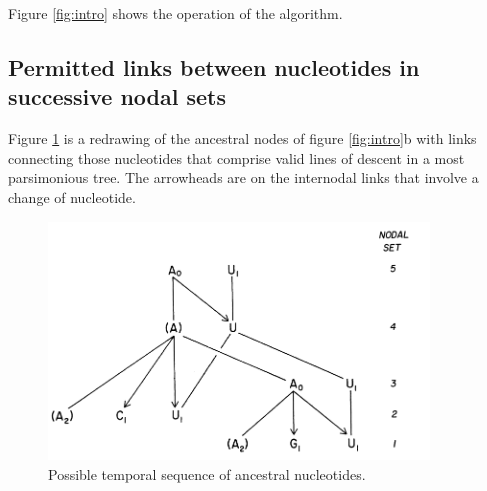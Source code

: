 Figure \ref{fig:intro} shows the operation of the algorithm.

\subsection{Permitted links between nucleotides in successive nodal sets}
Figure \ref{fig:temporal} is a redrawing of the ancestral nodes of figure \ref{fig:intro}b with links connecting those nucleotides that comprise valid lines of descent in a most parsimonious tree. The arrowheads are on the internodal links that involve a change of nucleotide.

\begin{figure}[H]
		\centering
		\includegraphics[width=0.9\textwidth]{4.png}
		\caption{Possible temporal sequence of ancestral nucleotides. }
		\label{fig:temporal}
	\end{figure}

